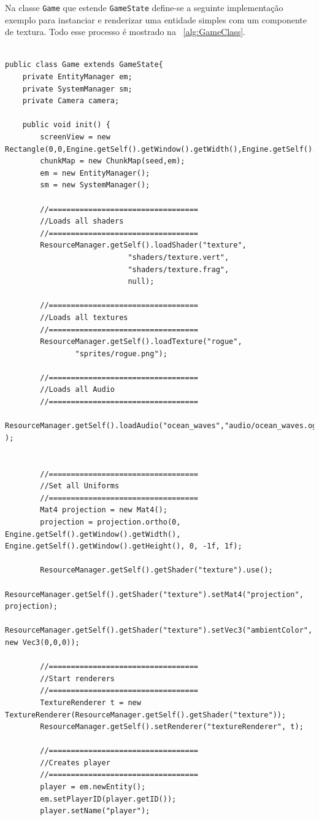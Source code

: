 \documentclass[12pt, 
openright, 
oneside, 
a4paper,    
brazil]{facom-ufu-abntex2}
\begin{document}
Na classe \texttt{Game} que estende \texttt{GameState} define-se a seguinte implementação exemplo para instanciar e renderizar uma entidade simples com um componente de textura. Todo esse processo é mostrado na \lstlistingname~\ref{alg:GameClass}.

 \begin{lstlisting}[caption=Classe Game, label={alg:GameClass}]
 
public class Game extends GameState{
	private EntityManager em;
	private SystemManager sm;
	private Camera camera;
	
	public void init() {
		screenView = new Rectangle(0,0,Engine.getSelf().getWindow().getWidth(),Engine.getSelf().getWindow().getHeight());
		chunkMap = new ChunkMap(seed,em);
		em = new EntityManager();
	 	sm = new SystemManager();
		
		//==================================
		//Loads all shaders
		//==================================
		ResourceManager.getSelf().loadShader("texture", 
							"shaders/texture.vert",
							"shaders/texture.frag",
							null);
		
		//==================================
		//Loads all textures
		//==================================
		ResourceManager.getSelf().loadTexture("rogue", 
				"sprites/rogue.png");
	
		//==================================
		//Loads all Audio
		//==================================
		ResourceManager.getSelf().loadAudio("ocean_waves","audio/ocean_waves.ogg" );


		//==================================
		//Set all Uniforms
		//==================================
		Mat4 projection = new Mat4();
		projection = projection.ortho(0, Engine.getSelf().getWindow().getWidth(), Engine.getSelf().getWindow().getHeight(), 0, -1f, 1f);

		ResourceManager.getSelf().getShader("texture").use();
		ResourceManager.getSelf().getShader("texture").setMat4("projection", projection);
		ResourceManager.getSelf().getShader("texture").setVec3("ambientColor", new Vec3(0,0,0));
	
		//==================================
		//Start renderers
		//==================================
		TextureRenderer t = new TextureRenderer(ResourceManager.getSelf().getShader("texture"));
		ResourceManager.getSelf().setRenderer("textureRenderer", t);
	
		//==================================
		//Creates player
		//==================================
		player = em.newEntity();
		em.setPlayerID(player.getID());
		player.setName("player");


\end{lstlisting}
\end{document}
